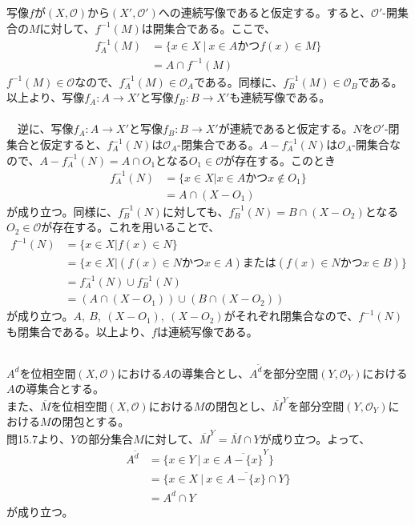 \documentclass{jsarticle}
\begin{document}
\subsection{}
写像$f$が$(X,\mathcal{O})$から$(X',\mathcal{O}')$への連続写像であると仮定する。すると、$\mathcal{O}'$-開集合の$M$に対して、$f^{-1}(M)$は開集合である。ここで、
\begin{align*}
f^{-1}_A(M)&=\{x\in X\ |\ x\in A かつ f(x)\in M\}\\
&=A\cap f^{-1}(M)
\end{align*}
$f^{-1}(M)\in\mathcal{O}$なので、$f^{-1}_A(M)\in\mathcal{O}_A$である。同様に、$f^{-1}_B(M)\in\mathcal{O}_B$である。以上より、写像$f_A:A\to X'$と写像$f_B:B\to X'$も連続写像である。\\
\\
　逆に、写像$f_A:A\to X'$と写像$f_B:B\to X'$が連続であると仮定する。$N$を$\mathcal{O}'$-閉集合と仮定すると、$f^{-1}_A(N)$は$\mathcal{O}_A$-閉集合である。$A-f^{-1}_A(N)$は$\mathcal{O}_A$-開集合なので、$A-f^{-1}_A(N)=A\cap O_1$となる$O_1\in\mathcal{O}$が存在する。このとき
\begin{align*}
f^{-1}_A(N)&=\{x\in X|x\in A かつ x\notin O_1\}\\
&=A\cap(X-O_1)
\end{align*}
が成り立つ。同様に、$f^{-1}_B(N)$に対しても、$f^{-1}_B(N)=B\cap(X-O_2)$となる$O_2\in\mathcal{O}$が存在する。これを用いることで、
\begin{align*}
f^{-1}(N)&=\{x\in X|f(x)\in N\}\\
&=\{x\in X|(f(x)\in N かつ x\in A)または(f(x)\in N かつ x\in B)\}\\
&=f^{-1}_A(N)\cup f^{-1}_B(N)\\
&=(A\cap (X-O_1))\cup(B\cap(X-O_2))
\end{align*}
が成り立つ。$A,\ B,\ (X-O_1),\ (X-O_2)$がそれぞれ閉集合なので、$f^{-1}(N)$も閉集合である。以上より、$f$は連続写像である。


\subsection{}
$A^{d}$を位相空間$(X,\mathcal{O})$における$A$の導集合とし、$A^{\tilde{d}}$を部分空間$(Y,\mathcal{O}_Y)$における$A$の導集合とする。\\
また、$\overline{M}$を位相空間$(X,\mathcal{O})$における$M$の閉包とし、$\overline{M}^Y$を部分空間$(Y,\mathcal{O}_Y)$における$M$の閉包とする。\\
問15.7より、$Y$の部分集合$M$に対して、$\overline{M}^Y=\overline{M}\cap Y$が成り立つ。よって、
\begin{align*}
A^{\tilde{d}}&=\{x\in Y\ |\ x\in \overline{A-\{x\}}^Y\}\\
&=\{x\in X\ |\ x\in \overline{A-\{x\}}\cap Y\}\\
&=A^{d}\cap Y
\end{align*}
が成り立つ。
\end{document}
